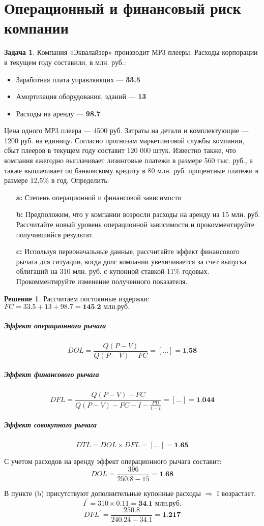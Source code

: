 \documentclass[a4paper, 14pt]{article}
\theoremstyle{plain} %
\theoremstyle{definition} %
\newtheorem*{solution}{Решение}
\newtheorem{problem}{Задача}[subsection]
\theoremstyle{remark} %
\begin{document}
\section{Операционный и финансовый риск компании}

\begin{problem}
	Компания «Эквалайзер» производит МР3 плееры. Расходы корпорации в текущем году составили, в млн. руб.:
	\begin{itemize}
		\item Заработная плата управляющих --- \textbf{33.5}
		\item Амортизация оборудования, зданий --- \textbf{13}
		\item Расходы на аренду --- \textbf{98.7}
	\end{itemize}
	Цена одного МР3 плеера --- 4500 руб. Затраты на детали и комплектующие --- 1200 руб. на единицу. Согласно прогнозам маркетинговой службы компании, сбыт плееров в текущем году составит 120 000 штук. Известно также, что компания ежегодно выплачивает лизинговые платежи в размере 560 тыс. руб., а также выплачивает по банковскому кредиту в 80 млн. руб. процентные платежи в размере 12,5\% в год. Определить:
	\begin{itemize}
		\item[\textbf{a:}] Степень операционной и финансовой зависимости
		\item[\textbf{b:}] Предположим,  что у компании возросли расходы на аренду на  15  млн. руб. Рассчитайте новый уровень операционной зависимости и прокомментируйте получившийся результат.
		\item[\textbf{c:}] Используя первоначальные данные, рассчитайте эффект финансового рычага для ситуации,  когда долг компании увеличивается за счет выпуска облигаций на  310  млн. руб.  с купонной ставкой 11\% годовых. Прокомментируйте изменение полученного показателя.
	\end{itemize}
	\begin{solution}
		Рассчитаем постоянные издержки: $FC = 33.5 + 13 + 98.7 = \textbf{145.2 млн.руб.}$
		\subparagraph{Эффект операционного рычага}
		\[DOL = \frac{Q(P-V)}{Q(P-V)-FC} = [...] = \textbf{1.58}\]
		\subparagraph{Эффект финансового рычага}
		\[DFL = \frac{Q(P-V)-FC}{Q(P-V)-FC-I-\frac{PD}{1-t}} = [...] = \textbf{1.044}\]
		\subparagraph{Эффект совокупного рычага}
		\[DTL = DOL \times DFL = [...] = \textbf{1.65}\]

		С учетом расходов на аренду эффект операционного рычага составит:
		\[DOL = \frac{396}{250.8-15} = \textbf{1.68}\]

		В пункте (b) присутствуют дополнительные купонные расходы $\Rightarrow$ I возрастает.
		\[I^{'} = 310 \times 0.11 = \textbf{34.1 млн.руб.}\]
		\[DFL^{'} = \frac{250.8}{240.24-34.1} = \textbf{1.217}\]
	\end{solution}
\end{problem}
\end{document}
